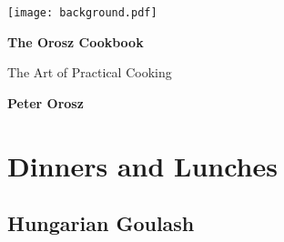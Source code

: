 \documentclass[
	11pt, %
	fleqn, %
	a4paper, %
]{LegrandOrangeBook}
\begin{document}

\titlepage %
	{\texttt{[image: background.pdf]}} %
	{ %
		\centering\sffamily %
		{\Huge\bfseries The Orosz Cookbook\par} %
		\vspace{16pt} %
		{\LARGE The Art of Practical Cooking\par} %
		\vspace{24pt} %
		{\huge\bfseries Peter Orosz\par} %
	}


\pagestyle{empty} %

\tableofcontents %

\pagestyle{fancy} %

\cleardoublepage %


\part{Dinners and Lunches}
	\chapterspaceabove{6.75cm}
	\chapterspacebelow{7.25cm}

	\chapter{Hungarian Goulash}
\end{document}
